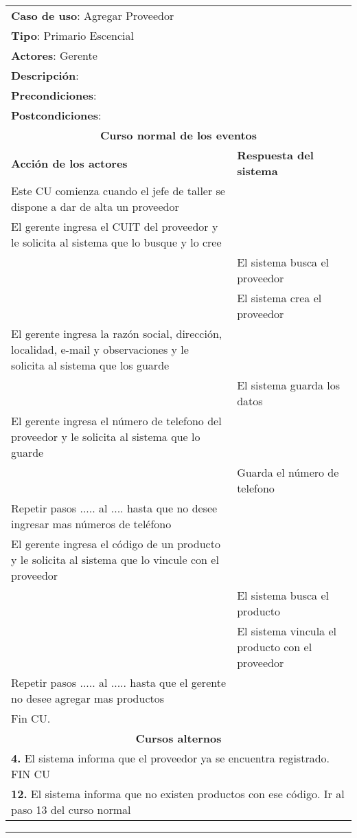 \documentclass[12pt]{extarticle}
\begin{document}
	\begin{longtable}{ |p{8cm}|p{8cm}| }
		\hline
		\multicolumn{2}{|p{16cm}|}{\textbf{Caso de uso}: Agregar Proveedor}\\
		\multicolumn{2}{|p{16cm}|}{\textbf{Tipo}: Primario Escencial}\\
		\multicolumn{2}{|p{16cm}|}{\textbf{Actores}: Gerente}\\
		\multicolumn{2}{|p{16cm}|}{\textbf{Descripción}: }\\
		\multicolumn{2}{|p{16cm}|}{\textbf{Precondiciones}: }\\
		\multicolumn{2}{|p{16cm}|}{\textbf{Postcondiciones}: }\\
		\hline
		\multicolumn{2}{|c|}{\textbf{Curso normal de los eventos}}\\
		\hline
		\textbf{Acción de los actores} & \textbf{Respuesta del sistema}\\
		\hline
			\inc Este CU comienza cuando el jefe de taller se dispone a dar de alta un proveedor& \\
			\hline
			\inc  El gerente ingresa el CUIT del proveedor y le solicita al sistema que lo busque y lo cree\\
			\hline
			& \inc  El sistema busca el proveedor \\
			\hline
			&\inc  El sistema crea el proveedor \\
			\hline
			\inc El gerente ingresa la razón social, dirección, localidad, e-mail y observaciones y le solicita al sistema que los guarde  &  \\
			\hline
			& \inc El sistema guarda los datos  \\
			\hline
			\inc El gerente ingresa el número de telefono del proveedor y le solicita al sistema que lo guarde &  \\
			\hline
			& \inc  Guarda el número de telefono \\
			\hline
			\inc  Repetir pasos ..... al .... hasta que no desee ingresar mas números de teléfono & \\
			\hline
			\inc El gerente ingresa el código de un producto y le solicita al sistema que lo vincule con el proveedor  &  \\
			\hline
			 & \inc El sistema busca el producto \\
			\hline
			& \inc El sistema vincula el producto con el proveedor   \\
			\hline
			\inc Repetir pasos ..... al ..... hasta que el gerente no desee agregar mas productos & \\
			\hline
			\inc Fin CU. & \\
		\hline
		\multicolumn{2}{|c|}{\textbf{Cursos alternos}}\\
		\hline
		\multicolumn{2}{|p{16cm}|}{\textbf{4. }El sistema informa que el proveedor ya se encuentra registrado. FIN CU}\\
		\hline
		\multicolumn{2}{|p{16cm}|}{\textbf{12. }El sistema informa que no existen productos con ese código. Ir al paso 13 del curso normal}\\
		\hline
		\end{longtable}


    \setcounter{step}{0}

    \noindent\rule{169mm}{0.8mm}\\
\end{document}
